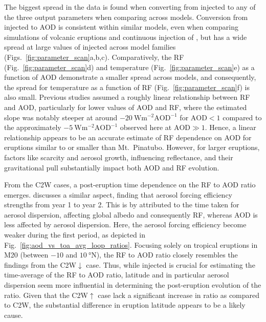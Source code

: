 \documentclass[draft]{agujournal2019}
\newcommand{\iso}[1][i]{{#1}njected \ce{SO2}}
\newcommand{\cwm}{C2W\(\downarrow\)}
\newcommand{\cwsn}{C2W\(\uparrow\)}
\begin{document}
The biggest spread in the data is found when converting from \iso{} to any of the three
output parameters when comparing across models. Conversion from \iso{} to AOD is
consistent within similar models, even when comparing simulations of volcanic eruptions
\cite{timmreck2010} and continuous injection of  \cite{niemeier2015}, but has
a wide spread at large values of \iso{} across model families
(Figs.~\ref{fig:parameter_scan}a,b,c). Comparatively, the RF
(Fig.~\ref{fig:parameter_scan}d) and temperature (Fig.~\ref{fig:parameter_scan}e) as a
function of AOD demonstrate a smaller spread across models, and consequently, the
spread for temperature as a function of RF (Fig.~\ref{fig:parameter_scan}f) is
also small. Previous studies assumed a roughly linear relationship between RF and
AOD, particularly for lower values of AOD and RF, where the estimated
slope was notably steeper at around \(\SI{-20}{\watt\metre^{-2}\mathrm{AOD}^{-1}}\) for
\(\mathrm{AOD}<1\) compared to the approximately
\(\SI{-5}{\watt\metre^{-2}\mathrm{AOD}^{-1}}\) observed here at \(\mathrm{AOD}\gg1\).
Hence, a linear relationship appears to be an accurate estimate of RF dependence
on AOD for eruptions similar to or smaller than Mt.\ Pinatubo. However, for larger
eruptions, factors like  scarcity and aerosol growth, influencing reflectance,
and their gravitational pull substantially impact both AOD and RF evolution.

From the C2W cases, a post-eruption time dependence on the RF to AOD
ratio emerges.  discusses a similar aspect, finding that aerosol
forcing efficiency strengths from year 1 to year 2. This is by 
attributed to the time taken for aerosol dispersion, affecting global albedo and
consequently RF, whereas AOD is less affected by aerosol dispersion. Here,
the aerosol forcing efficiency become weaker during the first period, as depicted in
Fig.~\ref{fig:aod_vs_toa_avg_loop_ratios}. Focusing solely on tropical eruptions in
M20 (between \(-10\) and \(\SI{10}{\degree\mathrm{N}}\)), the RF to
AOD ratio closely resembles the findings from the \cwm{} case. Thus, while
\iso{} is crucial for estimating the time-average of the RF to AOD ratio,
latitude and in particular aerosol dispersion seem more influential in determining the
post-eruption evolution of the ratio. Given that the \cwsn{} case lack a significant
increase in ratio as compared to C2W, the substantial difference in eruption
latitude appears to be a likely cause.
\end{document}
